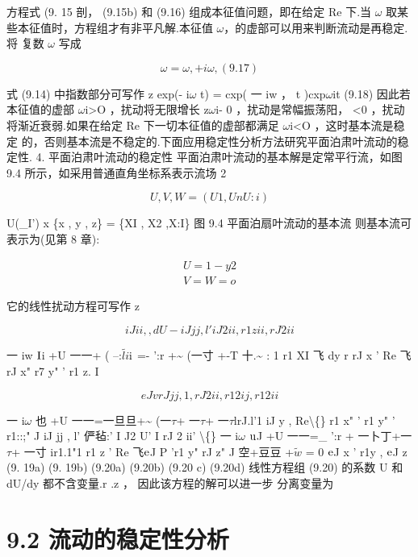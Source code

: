 方程式 (9. 15 剖， (9.15b) 和 (9.16) 组成本征值问题，即在给定 Re 下.当 $\omega$ 取某 些本征值时，方程组才有非平凡解.本征值 $\omega$，的虚部可以用来判断流动是再稳定.将 复数 $\omega$ 写成

\[\omega =\omega ,  +i\omega ,  (9. 17)\]

式 (9.14) 中指数部分可写作 z exp(- i$\omega$ t) = cxp( 一 iw ， t )cxp$\omega$it (9.18) 因此若本征值的虚部 $\omega$i>O ，扰动将无限增长 z$\omega$i- 0 ，扰动是常幅振荡阳， <0 ，扰动 将渐近衰弱.如果在给定 Re 下一切本征值的虚部都满足 $\omega$i<O ，这时基本流是稳定 的，否则基本流是不稳定的.下面应用稳定性分析方法研究平面泊肃叶流动的稳 定性. 4. 平面泊肃叶流动的稳定性 平面泊肃叶流动的基本解是定常平行流，如图9.4 所示，如采用普通直角坐标系表示流场 2

\[U ,V , W = (U1 , Un U:i)\]

U(\_I') x \{x , y , z\} = \{XI , X2 ,X:I\} 图 9.4 平面泊扇叶流动的基本流 则基本流可表示为(见第 8 章):

\begin{gather*}
U = 1- y2\\
V=W=o
\end{gather*}

它的线性扰动方程可写作 z

\[iJ ii , , dU   - iJ jj , l' iJ2 ii , r1 z ii , rJ 2 ii  \]

一 iw ${\rm I}$i +U 一一+ ( --:$\tilde{li}$${\rm i}$ =- ':r +\textasciitilde{} (一寸 +-T 十.\textasciitilde{} : 1 r1 XI 飞 dy r rJ x ' Re 飞rJ x" r7 y" ' r1 z. I

\[eJ v rJ jj , 1 ,rJ 2 ii , r1 2 ij , r1 2 ii  \]

一 i$\omega$ 也 +U 一一=一旦旦+\textasciitilde{} (一$\tau$+ 一$\tau$+ 一$\tau$lrJ.l'1 iJ y , Re\textbackslash\{\} r1 x" ' r1 y" ' r1::;" J iJ jj , l' 俨毡:' I J2 U' I rJ 2 ii' \textbackslash\{\} 一 i$\omega$ ${\rm u}$J +U 一一=\_ ':r + 一卜丁+一$\tau$+ 一寸 ir1.1"1 r1 z ' Re 飞${\rm e}$J P 'r1 y" rJ z" J 空+豆豆 +$\tilde{w}$ = 0 ${\rm e}$J x ' r1y , ${\rm e}$J z (9. 19a) (9. 19b) (9.20a) (9.20b) (9.20 c) (9.20d) 线性方程组 (9.20) 的系数 U 和 dU/dy 都不含变量.r .z ， 因此该方程的解可以进一步 分离变量为

\section*{9.2  流动的稳定性分析}

